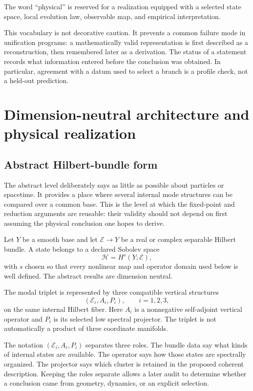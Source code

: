 \documentclass[11pt]{article}
\begin{document}
The word ``physical'' is reserved for a realization equipped with a selected
state space, local evolution law, observable map, and empirical interpretation.

This vocabulary is not decorative caution. It prevents a common failure mode
in unification programs: a mathematically valid representation is first
described as a reconstruction, then remembered later as a derivation. The
status of a statement records what information entered before the conclusion
was obtained. In particular, agreement with a datum used to select a branch
is a profile check, not a held-out prediction.

\section{Dimension-neutral architecture and physical realization}

\subsection{Abstract Hilbert-bundle form}

The abstract level deliberately says as little as possible about particles or
spacetime. It provides a place where several internal mode structures can be
compared over a common base. This is the level at which the fixed-point and
reduction arguments are reusable: their validity should not depend on first
assuming the physical conclusion one hopes to derive.

Let $Y$ be a smooth base and let $\mathcal E\to Y$ be a real or complex
separable Hilbert bundle. A state belongs to a declared Sobolev space
\[
\mathcal H=H^s(Y;\mathcal E),
\]
with $s$ chosen so that every nonlinear map and operator domain used below is
well defined. The abstract results are dimension neutral.

The modal triplet is represented by three compatible vertical structures
\[
 (\mathcal E_i,A_i,P_i),\qquad i=1,2,3,
\]
on the same internal Hilbert fiber. Here $A_i$ is a nonnegative self-adjoint
vertical operator and $P_i$ is its selected low spectral projector. The
triplet is not automatically a product of three coordinate manifolds.

The notation $(\mathcal E_i,A_i,P_i)$ separates three roles. The bundle data
say what kinds of internal states are available. The operator says how those
states are spectrally organized. The projector says which cluster is retained
in the proposed coherent description. Keeping the roles separate allows a
later audit to determine whether a conclusion came from geometry, dynamics,
or an explicit selection.
\end{document}
